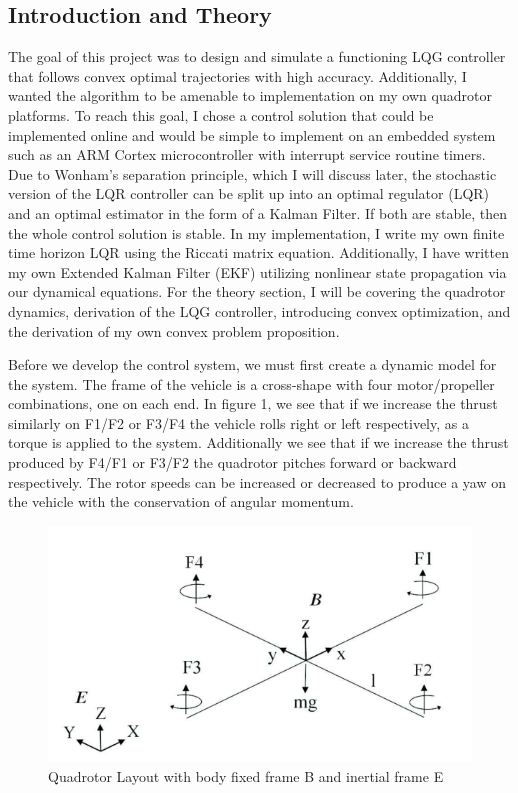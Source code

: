 \documentclass[conf]{new-aiaa}
\begin{document}
\clearpage
\begin{doublespace}

\section{Introduction and Theory}
The goal of this project was to design and simulate a functioning LQG controller that follows convex optimal trajectories with high accuracy. Additionally, I wanted the algorithm to be amenable to implementation on my own quadrotor platforms. To reach this goal, I chose a control solution that could be implemented online and would be simple to implement on an embedded system such as an ARM Cortex microcontroller with interrupt service routine timers. Due to Wonham's separation principle, which I will discuss later, the stochastic version of the LQR controller can be split up into an optimal regulator (LQR) and an optimal estimator in the form of a Kalman Filter. If both are stable, then the whole control solution is stable. In my implementation, I write my own finite time horizon LQR using the Riccati matrix equation. Additionally, I have written my own Extended Kalman Filter (EKF) utilizing nonlinear state propagation via our dynamical equations. For the theory section, I will be covering the quadrotor dynamics, derivation of the LQG controller, introducing convex optimization, and the derivation of my own convex problem proposition.

Before we develop the control system, we must first create a dynamic model for the system. The frame of the vehicle is a cross-shape with four motor/propeller combinations, one on each end. In figure 1, we see that if we increase the thrust similarly on F1/F2 or F3/F4 the vehicle rolls right or left respectively, as a torque is applied to the system. Additionally we see that if we increase the thrust produced by F4/F1 or F3/F2 the quadrotor pitches forward or backward respectively. The rotor speeds can be increased or decreased to produce a yaw on the vehicle with the conservation of angular momentum. 


\begin{figure}[!h]
	\centering
	\includegraphics[scale= 0.45]{quad.png}
	\caption{Quadrotor Layout with body fixed frame B and inertial frame E}
	\label{fig:f1}
\end{figure}
	

\end{doublespace}
\end{document}
